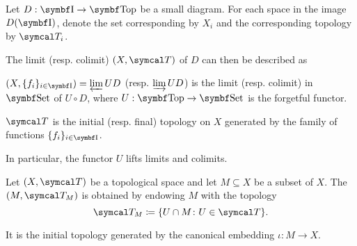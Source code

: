 \begin{proposition}\label{thm:initial_final_topology_limit}\cite{nLab:top}
  Let \( D: \Bold I \to \Cat{Top} \) be a small diagram. For each space in the image \( D(\Bold I) \), denote the set corresponding by \( X_i \) and the corresponding topology by \( \Cal{T}_i \).

  The limit (resp. colimit) \( (X, \Cal{T}) \) of \( D \) can then be described as
  \begin{defenum}
    \item \( (X, \{ f_i \}_{i \in \Cat{I}}) = \varprojlim UD \) (resp. \( \varinjlim UD \)) is the limit (resp. colimit) in \( \Bold{Set} \) of \( U \circ D \), where \( U: \Bold{Top} \to \Bold{Set} \) is the forgetful functor.
    \item \( \Cal{T} \) is the initial (resp. final) topology on \( X \) generated by the family of functions \( \{ f_i \}_{i \in \Cat{I}} \).
  \end{defenum}

  In particular, the functor \( U \) lifts limits and colimits.
\end{proposition}

\begin{definition}\label{def:topological_subspace}
  Let \( (X, \Cal{T}) \) be a topological space and let \( M \subseteq X \) be a subset of \( X \). The  \( (M, \Cal{T}_M) \) is obtained by endowing \( M \) with the topology
  \begin{equation*}
    \Cal{T}_M \coloneqq \{ U \cap M \colon U \in \Cal{T} \}.
  \end{equation*}

  It is the initial topology generated by the canonical embedding \( \iota: M \to X \).
\end{definition}

